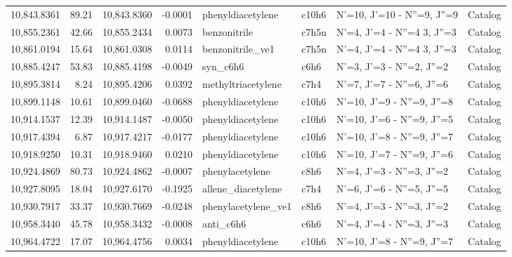\begin{longtable}{rrrrllll}
10,843.8361 &     89.21 &       10,843.8360 &   -0.0001 &           phenyldiacetylene &   c10h6 &          N'=10, J'=10 - N''=9, J''=9 &    Catalog \\
10,855.2361 &     42.66 &       10,855.2434 &    0.0073 &                benzonitrile &   c7h5n &      N'=4, J'=4 - N''=4     3, J''=3 &    Catalog \\
10,861.0194 &     15.64 &       10,861.0308 &    0.0114 &            benzonitrile_ve1 &   c7h5n &      N'=4, J'=4 - N''=4     3, J''=3 &    Catalog \\
10,885.4247 &     53.83 &       10,885.4198 &   -0.0049 &                    syn_c6h6 &    c6h6 &            N'=3, J'=3 - N''=2, J''=2 &    Catalog \\
10,895.3814 &      8.24 &       10,895.4206 &    0.0392 &          methyltriacetylene &    c7h4 &            N'=7, J'=7 - N''=6, J''=6 &    Catalog \\
10,899.1148 &     10.61 &       10,899.0460 &   -0.0688 &           phenyldiacetylene &   c10h6 &           N'=10, J'=9 - N''=9, J''=8 &    Catalog \\
10,914.1537 &     12.39 &       10,914.1487 &   -0.0050 &           phenyldiacetylene &   c10h6 &           N'=10, J'=6 - N''=9, J''=5 &    Catalog \\
10,917.4394 &      6.87 &       10,917.4217 &   -0.0177 &           phenyldiacetylene &   c10h6 &           N'=10, J'=8 - N''=9, J''=7 &    Catalog \\
10,918.9250 &     10.31 &       10,918.9460 &    0.0210 &           phenyldiacetylene &   c10h6 &           N'=10, J'=7 - N''=9, J''=6 &    Catalog \\
10,924.4869 &     80.73 &       10,924.4862 &   -0.0007 &             phenylacetylene &    c8h6 &            N'=4, J'=3 - N''=3, J''=2 &    Catalog \\
10,927.8095 &     18.04 &       10,927.6170 &   -0.1925 &          allene_diacetylene &    c7h4 &            N'=6, J'=6 - N''=5, J''=5 &    Catalog \\
10,930.7917 &     33.37 &       10,930.7669 &   -0.0248 &         phenylacetylene_ve1 &    c8h6 &            N'=4, J'=3 - N''=3, J''=2 &    Catalog \\
10,958.3440 &     45.78 &       10,958.3432 &   -0.0008 &                   anti_c6h6 &    c6h6 &            N'=4, J'=4 - N''=3, J''=3 &    Catalog \\
10,964.4722 &     17.07 &       10,964.4756 &    0.0034 &           phenyldiacetylene &   c10h6 &           N'=10, J'=8 - N''=9, J''=7 &    Catalog \\

\end{longtable}
